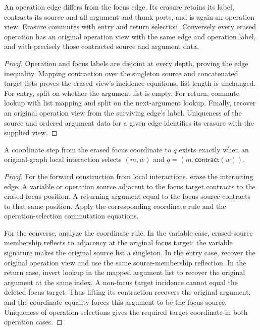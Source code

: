\begin{lemma}
An operation edge differs from the focus edge. Its erasure retains its label,
contracts its source and all argument and thunk ports, and is again an operation
view. Erasure commutes with entry and return selection. Conversely every erased
operation has an original operation view with the same edge and operation label,
and with precisely those contracted source and argument data.
\end{lemma}
\begin{proof}
Operation and focus labels are disjoint at every depth, proving the edge
inequality. Mapping contraction over the singleton source and concatenated target
lists proves the erased view's incidence equations; list length is unchanged.
For entry, split on whether the argument list is empty. For return, commute
lookup with list mapping and split on the next-argument lookup. Finally, recover
an original operation view from the surviving edge's label. Uniqueness of the
source and ordered argument data for a given edge identifies its erasure with
the supplied view.
\end{proof}

\begin{theorem}
A coordinate step from the erased focus coordinate to $q$ exists exactly when
an original-graph local interaction selects $(m,w)$ and
$q=(m,\mathsf{contract}(w))$.
\end{theorem}
\begin{proof}
For the forward construction from local interactions, erase the interacting
edge. A variable or operation source adjacent to the focus target contracts to
the erased focus position. A returning argument equal to the focus source
contracts to that same position. Apply the corresponding coordinate rule and
the operation-selection commutation equations.

For the converse, analyze the coordinate rule. In the variable case,
erased-source membership reflects to adjacency at the original focus target;
the variable signature makes the original source list a singleton. In the entry
case, recover the original operation view and use the same source-membership
reflection. In the return case, invert lookup in the mapped argument list to
recover the original argument at the same index. A non-focus target incidence
cannot equal the deleted focus target. Thus lifting its contraction recovers
the original argument, and the coordinate equality forces this argument to be
the focus source. Uniqueness of operation selections gives the required target
coordinate in both operation cases.
\end{proof}

